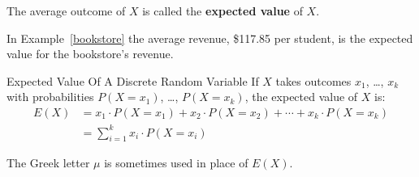\documentclass{beamer}
\newcommand{\prob}[1]{P\left({#1}\right)}
\begin{document}
\begin{frame}
\begin{definition}
The average outcome of $X$ is called the \textbf{expected value} of $X$.
\end{definition}\pause

\begin{example}
In Example~\ref{bookstore} the average revenue, \$117.85 per student, is the expected value for the bookstore's revenue.

\begin{center}
\end{center}
\end{example}
\end{frame}

\begin{frame}
\begin{block}{Expected Value Of A Discrete Random Variable}
If $X$ takes outcomes $x_1$, \ldots, $x_k$ with probabilities $\prob{X=x_1}$, \ldots, $\prob{X=x_k}$, the expected value of $X$ is:
\begin{equation*}
\begin{aligned}
E(X) &= x_1\cdot\prob{X=x_1} + x_2\cdot\prob{X=x_2} + \cdots + x_k\cdot\prob{X=x_k} \\
&= \sum_{i=1}^{k} x_i\cdot\prob{X=x_i}
\end{aligned}
\end{equation*}\pause
\end{block}

\begin{note}
The Greek letter $\mu$ is sometimes used in place of $E(X)$.
\end{note}
\end{frame}
\end{document}

